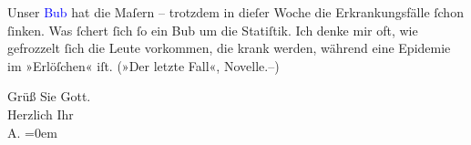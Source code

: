 \pstart
           Unser \textcolor{blue}{Bub}{}\ledrightnote{{$\rightarrow$}\textcolor{blue}{Heinrich Schnitzler}} hat die Maſern –
               trotzdem in dieſer Woche die Erkrankungsfälle ſchon ſinken. Was ſchert ſich ſo ein
               Bub um die Statiſtik. Ich denke mir oft, wie gefrozzelt ſich die Leute vorkommen, die
               krank werden, während eine {\pb}Epidemie im
               »Erlöſchen« iſt. (»Der letzte Fall«, Novelle.–)\pend
           
\pstart
           Grüß Sie Gott. {\\[\baselineskip]}Herzlich Ihr {\\[\baselineskip]}\spacefill\mbox{A.}\pend
           \leftskip=0em{}\endnumbering{}  
      